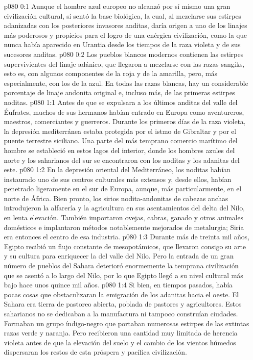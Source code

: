 \author{Arcángel}
\vs p080 0:1 Aunque el hombre azul europeo no alcanzó por sí mismo una gran civilización cultural, sí sentó la base biológica, la cual, al mezclarse sus estirpes adanizadas con los posteriores invasores anditas, daría origen a uno de los linajes más poderosos y propicios para el logro de una enérgica civilización, como la que nunca había aparecido en Urantia desde los tiempos de la raza violeta y de sus sucesores anditas.
\vs p080 0:2 Los pueblos blancos modernos contienen las estirpes supervivientes del linaje adánico, que llegaron a mezclarse con las razas sangiks, esto es, con algunos componentes de la roja y de la amarilla, pero, más especialmente, con los de la azul. En todas las razas blancas, hay un considerable porcentaje de linaje andonita original e, incluso más, de las primeras estirpes noditas.
\vs p080 1:1 Antes de que se expulsara a los últimos anditas del valle del Éufrates, muchos de sus hermanos habían entrado en Europa como aventureros, maestros, comerciantes y guerreros. Durante los primeros días de la raza violeta, la depresión mediterránea estaba protegida por el istmo de Gibraltar y por el puente terrestre siciliano. Una parte del más temprano comercio marítimo del hombre se estableció en estos lagos del interior, donde los hombres azules del norte y los saharianos del sur se encontraron con los noditas y los adanitas del este.
\vs p080 1:2 En la depresión oriental del Mediterráneo, los noditas habían instaurado uno de sus centros culturales más extensos y, desde ellos, habían penetrado ligeramente en el sur de Europa, aunque, más particularmente, en el norte de África. Bien pronto, los sirios nodita\hyp{}andonitas de cabezas anchas introdujeron la alfarería y la agricultura en sus asentamientos del delta del Nilo, en lenta elevación. También importaron ovejas, cabras, ganado y otros animales domésticos e implantaron métodos notablemente mejorados de metalurgia; Siria era entonces el centro de esa industria.
\vs p080 1:3 Durante más de treinta mil años, Egipto recibió un flujo constante de mesopotámicos, que llevaron consigo su arte y su cultura para enriquecer la del valle del Nilo. Pero la entrada de un gran número de pueblos del Sahara deterioró enormemente la temprana civilización que se asentó a lo largo del Nilo, por lo que Egipto llegó a su nivel cultural más bajo hace unos quince mil años.
\vs p080 1:4 Si bien, en tiempos pasados, había pocas cosas que obstaculizaran la emigración de los adanitas hacia el oeste. El Sahara era tierra de pastoreo abierta, poblada de pastores y agricultores. Estos saharianos no se dedicaban a la manufactura ni tampoco construían ciudades. Formaban un grupo índigo\hyp{}negro que portaban numerosas estirpes de las extintas razas verde y naranja. Pero recibieron una cantidad muy limitada de herencia violeta antes de que la elevación del suelo y el cambio de los vientos húmedos dispersaran los restos de esta próspera y pacífica civilización.
